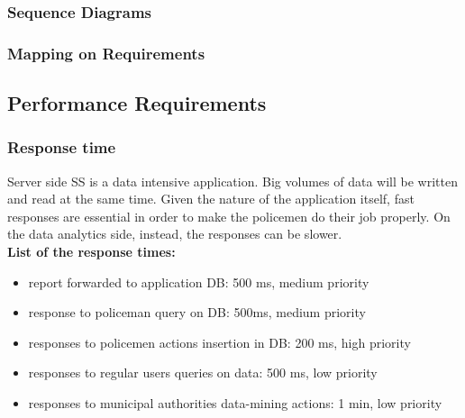 	\subsubsection{Sequence Diagrams}
	
	\subsubsection{Mapping on Requirements}
	
\subsection{Performance Requirements}

	\subsubsection{Response time}
	
Server side SS is a data intensive application. Big volumes of data  will be written and read at the same time. Given the nature of the application itself, fast responses are essential in order to make the policemen do their job properly. On the data analytics side, instead, the responses can be slower.\\

\textbf{List of the response times:}
\begin{itemize}
\item report forwarded to application DB: 500 ms, medium priority
\item response to policeman query on DB: 500ms, medium priority
\item responses to policemen actions insertion in DB: 200 ms, high priority
\item responses to regular users queries on data: 500 ms, low priority
\item responses to municipal authorities data-mining actions: 1 min, low priority
\end{itemize}
